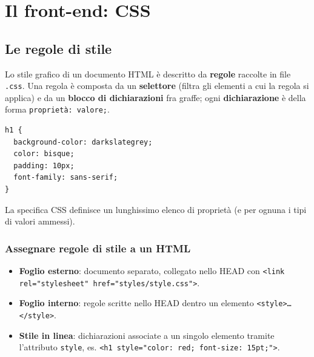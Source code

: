 \chapter{Il front-end: CSS}

\section{Le regole di stile}

\begin{definizione}
Lo stile grafico di un documento HTML \`e descritto da \textbf{regole} raccolte in file
\texttt{.css}. Una regola \`e composta da un \textbf{selettore} (filtra gli elementi a cui
la regola si applica) e da un \textbf{blocco di dichiarazioni} fra graffe; ogni
\textbf{dichiarazione} \`e della forma \texttt{propriet\`a: valore;}.
\begin{lstlisting}[language=HTMLCSS]
h1 {
  background-color: darkslategrey;
  color: bisque;
  padding: 10px;
  font-family: sans-serif;
}
\end{lstlisting}
La specifica CSS definisce un lunghissimo elenco di propriet\`a (e per ognuna i tipi di
valori ammessi).
\end{definizione}

\subsection{Assegnare regole di stile a un HTML}
\begin{itemize}
  \item \textbf{Foglio esterno}: documento separato, collegato nello HEAD con
        \texttt{<link rel="stylesheet" href="styles/style.css">}.
  \item \textbf{Foglio interno}: regole scritte nello HEAD dentro un elemento
        \texttt{<style>\dots</style>}.
  \item \textbf{Stile in linea}: dichiarazioni associate a un singolo elemento tramite
        l'attributo \texttt{style}, es.
        \texttt{<h1 style="color: red; font-size: 15pt;">}.
\end{itemize}

